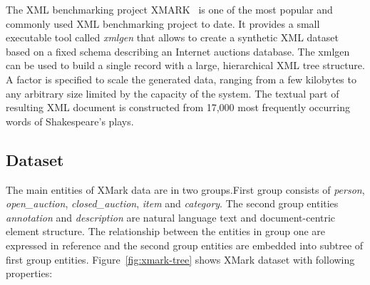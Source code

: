 The XML benchmarking project XMARK~\citep{xmark/original} is one of the most popular and commonly used XML benchmarking project to date. It provides a small executable tool called \textit{xmlgen} that allows to create a synthetic XML dataset based on a fixed schema describing an Internet auctions database. The xmlgen can be used to build  a single record with a large, hierarchical XML tree structure. A factor is specified to scale the generated data, ranging from a few kilobytes to any arbitrary size limited by the capacity of the system. The textual part of resulting XML document is constructed from 17,000 most frequently occurring words of Shakespeare's plays.

\subsection{Dataset}\label{xmark-dataset}
The main entities of XMark data are in two groups.First group consists of  \textit{person}, \textit{open\_auction}, \textit{closed\_auction}, \textit{item} and \textit{category}. The second group entities \textit{annotation} and \textit{description} are natural language text and document-centric element structure. The relationship between the entities in group one are expressed in reference and the second group entities are embedded into subtree of first group entities. Figure~\ref{fig:xmark-tree} shows XMark dataset with following properties:
\label{xmark:desc:each}
